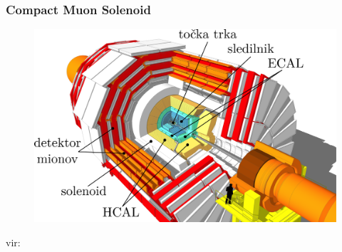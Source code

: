 \documentclass[14pt, t]{beamer}
\begin{document}

    


\begin{frame}
    \frametitle{Compact Muon Solenoid}
    \begin{figure}[htb!]
        \centering
        \includegraphics[width=\linewidth]{raster/raster-svg-slo/cms-annotated.pdf}
    \end{figure}
    \vspace{-5mm}
    \tiny{vir: \cite{image-cms}}
    
\end{frame}
\end{document}
